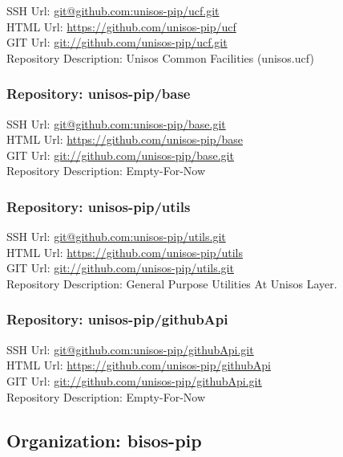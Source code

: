 SSH Url:  \url{git@github.com:unisos-pip/ucf.git}\\
HTML Url: \url{https://github.com/unisos-pip/ucf}\\
GIT Url:  \url{git://github.com/unisos-pip/ucf.git}\\


Repository Description: Unisos Common Facilities (unisos.ucf)

\subsubsection{Repository: unisos-pip/base}

SSH Url:  \url{git@github.com:unisos-pip/base.git}\\
HTML Url: \url{https://github.com/unisos-pip/base}\\
GIT Url:  \url{git://github.com/unisos-pip/base.git}\\


Repository Description: Empty-For-Now

\subsubsection{Repository: unisos-pip/utils}

SSH Url:  \url{git@github.com:unisos-pip/utils.git}\\
HTML Url: \url{https://github.com/unisos-pip/utils}\\
GIT Url:  \url{git://github.com/unisos-pip/utils.git}\\


Repository Description: General Purpose Utilities At Unisos Layer.

\subsubsection{Repository: unisos-pip/githubApi}

SSH Url:  \url{git@github.com:unisos-pip/githubApi.git}\\
HTML Url: \url{https://github.com/unisos-pip/githubApi}\\
GIT Url:  \url{git://github.com/unisos-pip/githubApi.git}\\


Repository Description: Empty-For-Now

\subsection{Organization: bisos-pip}

